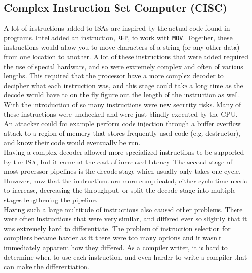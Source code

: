 \documentclass[10pt]{article}
\begin{document}
\subsection{Complex Instruction Set Computer (CISC)}
A lot of instructions added to ISAs are inspired by the actual code found in programs. Intel added an instruction, \texttt{REP}, to work with \texttt{MOV}. Together, these instructions would allow you to move characters of a string (or any other data) from one location to another. A lot of these instructions that were added required the use of special hardware, and so were extremely complex and often of various lengths. This required that the processor have a more complex decoder to decipher what each instruction was, and this stage could take a long time as the decode would have to on the fly figure out the length of the instruction as well. With the introduction of so many instructions were new security risks. Many of these instructions were unchecked and were just blindly executed by the CPU. An attacker could for example perform code injection through a buffer overflow attack to a region of memory that stores frequently used code (e.g. destructor), and know their code would eventually be run.\\
\newline
Having a complex decoder allowed more specialized instructions to be supported by the ISA, but it came at the cost of increased latency. The second stage of most processor pipelines is the decode stage which usually only takes one cycle. However, now that the instructions are more complicated, either cycle time needs to increase, decreasing the throughput, or split the decode stage into multiple stages lengthening the pipeline.\\
\newline
Having such a large multitude of instructions also caused other problems. There were often instructions that were very similar, and differed ever so slightly that it was extremely hard to differentiate. The problem of instruction selection for compilers became harder as it there were too many options and it wasn't immediately apparent how they differed. As a compiler writer, it is hard to determine when to use each instruction, and even harder to write a compiler that can make the differentiation.\\
\end{document}
